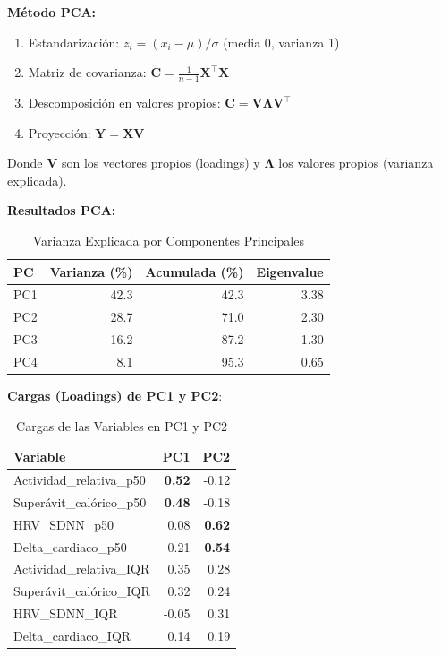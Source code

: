 \documentclass[12pt,letterpaper,twoside]{report}
\newcommand{\mat}[1]{\mathbf{#1}}
\begin{document}
\begin{estadisticobox}
\textbf{Método PCA:}

\begin{enumerate}[noitemsep]
    \item Estandarización: $z_i = (x_i - \mu) / \sigma$ (media 0, varianza 1)
    \item Matriz de covarianza: $\mat{C} = \frac{1}{n-1}\mat{X}^\top\mat{X}$
    \item Descomposición en valores propios: $\mat{C} = \mat{V}\mat{\Lambda}\mat{V}^\top$
    \item Proyección: $\mat{Y} = \mat{X}\mat{V}$
\end{enumerate}

Donde $\mat{V}$ son los vectores propios (loadings) y $\mat{\Lambda}$ los valores propios (varianza explicada).
\end{estadisticobox}

\begin{calculobox}
\textbf{Resultados PCA:}

\begin{table}[H]
\centering
\caption{Varianza Explicada por Componentes Principales}
\label{tab:pca_variance}
\begin{tabular}{@{}lrrr@{}}
\toprule
\textbf{PC} & \textbf{Varianza (\%)} & \textbf{Acumulada (\%)} & \textbf{Eigenvalue} \\
\midrule
PC1 & 42.3 & 42.3 & 3.38 \\
PC2 & 28.7 & 71.0 & 2.30 \\
PC3 & 16.2 & 87.2 & 1.30 \\
PC4 & 8.1  & 95.3 & 0.65 \\
\bottomrule
\end{tabular}
\end{table}

\textbf{Cargas (Loadings) de PC1 y PC2}:

\begin{table}[H]
\centering
\begin{tabular}{@{}lrr@{}}
\toprule
\textbf{Variable} & \textbf{PC1} & \textbf{PC2} \\
\midrule
Actividad\_relativa\_p50     & \textbf{0.52} & -0.12 \\
Superávit\_calórico\_p50     & \textbf{0.48} & -0.18 \\
HRV\_SDNN\_p50               & 0.08 & \textbf{0.62} \\
Delta\_cardiaco\_p50         & 0.21 & \textbf{0.54} \\
Actividad\_relativa\_IQR     & 0.35 & 0.28 \\
Superávit\_calórico\_IQR     & 0.32 & 0.24 \\
HRV\_SDNN\_IQR               & -0.05 & 0.31 \\
Delta\_cardiaco\_IQR         & 0.14 & 0.19 \\
\bottomrule
\end{tabular}
\caption{Cargas de las Variables en PC1 y PC2}
\label{tab:pca_loadings}
\end{table}
\end{calculobox}
\end{document}
